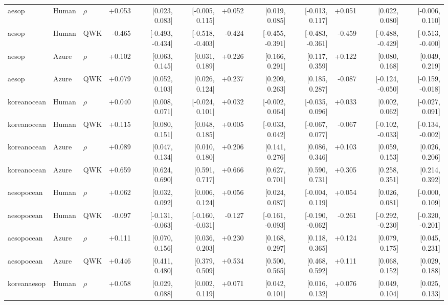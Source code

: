 \documentclass[10pt]{article}
\begin{document}
\begin{landscape}
\begin{longtable}{@{}lllrrrrrrrrr@{}}
\addlinespace[2pt]
aesop & Human & $\rho$ & +0.053 & [0.023, 0.083] & [-0.005, 0.115] & +0.052 & [0.019, 0.085] & [-0.013, 0.117] & +0.051 & [0.022, 0.080] & [-0.006, 0.110]\\
aesop & Human & QWK & -0.465 & [-0.493, -0.434] & [-0.518, -0.403] & -0.424 & [-0.455, -0.391] & [-0.483, -0.361] & -0.459 & [-0.488, -0.429] & [-0.513, -0.400]\\
aesop & Azure & $\rho$ & +0.102 & [0.063, 0.145] & [0.031, 0.189] & +0.226 & [0.166, 0.291] & [0.117, 0.359] & +0.122 & [0.080, 0.168] & [0.049, 0.219]\\
aesop & Azure & QWK & +0.079 & [0.052, 0.103] & [0.026, 0.124] & +0.237 & [0.209, 0.263] & [0.185, 0.287] & -0.087 & [-0.124, -0.050] & [-0.159, -0.018]\\
\addlinespace[2pt]
koreanocean & Human & $\rho$ & +0.040 & [0.008, 0.071] & [-0.024, 0.101] & +0.032 & [-0.002, 0.064] & [-0.035, 0.096] & +0.033 & [0.002, 0.062] & [-0.027, 0.091]\\
koreanocean & Human & QWK & +0.115 & [0.080, 0.151] & [0.048, 0.185] & +0.005 & [-0.033, 0.042] & [-0.067, 0.077] & -0.067 & [-0.102, -0.033] & [-0.134, -0.002]\\
koreanocean & Azure & $\rho$ & +0.089 & [0.047, 0.134] & [0.010, 0.180] & +0.206 & [0.141, 0.276] & [0.086, 0.346] & +0.103 & [0.059, 0.153] & [0.026, 0.206]\\
koreanocean & Azure & QWK & +0.659 & [0.624, 0.690] & [0.591, 0.717] & +0.666 & [0.627, 0.701] & [0.590, 0.731] & +0.305 & [0.258, 0.351] & [0.214, 0.392]\\
\addlinespace[2pt]
aesopocean & Human & $\rho$ & +0.062 & [0.032, 0.092] & [0.006, 0.124] & +0.056 & [0.024, 0.087] & [-0.004, 0.119] & +0.054 & [0.026, 0.081] & [-0.000, 0.109]\\
aesopocean & Human & QWK & -0.097 & [-0.131, -0.063] & [-0.160, -0.031] & -0.127 & [-0.161, -0.093] & [-0.190, -0.062] & -0.261 & [-0.292, -0.230] & [-0.320, -0.201]\\
aesopocean & Azure & $\rho$ & +0.111 & [0.070, 0.156] & [0.036, 0.203] & +0.230 & [0.168, 0.297] & [0.118, 0.365] & +0.124 & [0.079, 0.175] & [0.045, 0.231]\\
aesopocean & Azure & QWK & +0.446 & [0.411, 0.480] & [0.379, 0.509] & +0.534 & [0.500, 0.565] & [0.468, 0.592] & +0.111 & [0.068, 0.152] & [0.029, 0.188]\\
\addlinespace[2pt]
koreanaesop & Human & $\rho$ & +0.058 & [0.029, 0.088] & [0.002, 0.119] & +0.071 & [0.042, 0.101] & [0.016, 0.132] & +0.076 & [0.049, 0.104] & [0.025, 0.133]\\

\end{longtable}
\end{landscape}
\end{document}
